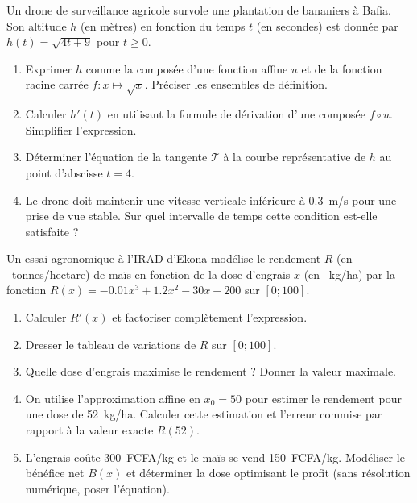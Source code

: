 \documentclass[11pt]{article}
\begin{document}
\begin{exercice}
Un drone de surveillance agricole survole une plantation de bananiers à Bafia. Son altitude $h$ (en mètres) en fonction du temps $t$ (en secondes) est donnée par $h(t) = \sqrt{4t + 9}$ pour $t \ge 0$.
\begin{enumerate}
    \item Exprimer $h$ comme la composée d'une fonction affine $u$ et de la fonction racine carrée $f : x \mapsto \sqrt{x}$. Préciser les ensembles de définition.
    \item Calculer $h'(t)$ en utilisant la formule de dérivation d'une composée $f \circ u$. Simplifier l'expression.
    \item Déterminer l'équation de la tangente $\mathcal{T}$ à la courbe représentative de $h$ au point d'abscisse $t=4$.
    \item Le drone doit maintenir une vitesse verticale inférieure à \SI{0.3}{m/s} pour une prise de vue stable. Sur quel intervalle de temps cette condition est-elle satisfaite ?
\end{enumerate}
\end{exercice}

\begin{exercice}
Un essai agronomique à l'IRAD d'Ekona modélise le rendement $R$ (en \SI{}{tonnes/hectare}) de maïs en fonction de la dose d'engrais $x$ (en \SI{}{kg/ha}) par la fonction $R(x) = -0.01x^3 + 1.2x^2 - 30x + 200$ sur $[0; 100]$.
\begin{enumerate}
    \item Calculer $R'(x)$ et factoriser complètement l'expression.
    \item Dresser le tableau de variations de $R$ sur $[0; 100]$.
    \item Quelle dose d'engrais maximise le rendement ? Donner la valeur maximale.
    \item On utilise l'approximation affine en $x_0 = 50$ pour estimer le rendement pour une dose de \SI{52}{kg/ha}. Calculer cette estimation et l'erreur commise par rapport à la valeur exacte $R(52)$.
    \item L'engrais coûte \SI{300}{FCFA/kg} et le maïs se vend \SI{150}{FCFA/kg}. Modéliser le bénéfice net $B(x)$ et déterminer la dose optimisant le profit (sans résolution numérique, poser l'équation).
\end{enumerate}
\end{exercice}
\end{document}
